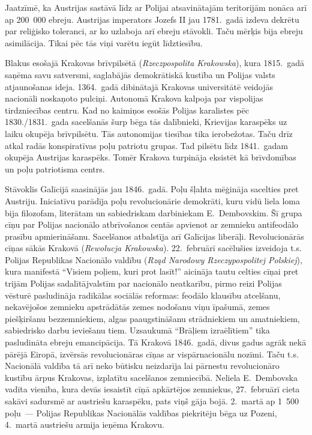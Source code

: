 \documentclass[twoside,a5paper,12pt,fleqn,openany]{extbook}
\newcommand{\pltxti}[1]{\textit{\textpolish{#1}}}
\begin{document}
Jaatzīmē, ka Austrijas sastāvā līdz ar Polijai atsavinātajām teritorijām nonāca arī ap 200~000 ebreju. Austrijas imperators Jozefs II jau 1781.~gadā izdeva dekrētu par reliģisko toleranci, ar ko uzlaboja arī ebreju stāvokli. Taču mērķis bija ebreju asimilācija. Tikai pēc tās viņi varētu iegūt līdztiesību.

Blakus esošajā Krakovas brīvpilsētā (\pltxti{Rzeczpospolita Krakowska}), kura 1815.~gadā saņēma savu satversmi, saglabājās demokrātiskā kustība un Polijas valsts atjaunošanas ideja. 1364.~gadā dibinātajā Krakovas universitātē veidojās nacionāli noskaņoto pulciņi. Autonomā Krakova kalpoja par vispolijas tirdzniecības centru. Kad no kaimiņos esošās Polijas karalistes pēc 1830./1831.~gada sacelšanās šurp bēga tās dalībnieki, Krievijas karaspēks uz laiku okupēja brīvpilsētu. Tās autonomijas tiesības tika ierobežotas. Taču drīz atkal radās konspiratīvas poļu patriotu grupas. Tad pilsētu līdz 1841.~gadam okupēja Austrijas karaspēks. Tomēr Krakova turpināja eksistēt kā brīvdomības un poļu patriotisma centrs.

Stāvoklis Galīcijā saasinājās jau 1846.~gadā. Poļu šļahta mēģināja sacelties pret Austriju. Iniciatīvu parādīja poļu revolucionārie demokrāti, kuru vidū liela loma bija filozofam, literātam un sabiedriskam darbiniekam E.~Dembovskim. Šī grupa cīņu par Polijas nacionālo atbrīvošanos centās apvienot ar zemnieku antifeodālo prasību apmierināšanu. Sacelšanos atbalstīja arī Galīcijas liberāļi. Revolucionārās cīņas sākās Krakovā (\pltxti{Rewolucja Krakowska}). 22.~februārī sacēlušies izveidoja t.s. Polijas Republikas Nacionālo valdību (\pltxti{Rząd Narodowy Rzeczypospolitej Polskiej}), kura manifestā ``Visiem poļiem, kuri prot lasīt!'' aicināja tautu celties cīņai pret trijām Polijas sadalītājvalstīm par nacionālo neatkarību, pirmo reizi Polijas vēsturē pasludināja radikālas sociālās reformas: feodālo klausību atcelšanu, nekavējošos zemnieku apstrādātās zemes nodošanu viņu īpašumā, zemes piešķiršanu bezzemniekiem, algas paaugstināšanu strādniekiem un amatniekiem, sabiedrisko darbu ieviešanu tiem. Uzsaukumā ``Brāļiem izraēlītiem'' tika pasludināta ebreju emancipācija. Tā Krakovā 1846.~gadā, divus gadus agrāk nekā pārējā Eiropā, izvērsās revolucionāras cīņas ar vispārnacionālu nozīmi. Taču t.s. Nacionālā valdība tā arī neko būtisku neizdarīja lai pārnestu revolucionāro kustību ārpus Krakovas, izplatītu sacelšanos zemniecībā. Neliela E.~Dembovska vadīta vienība, kura devās iesaistīt cīņā apkārtējos zemniekus, 27.~februārī cieta sakāvi sadursmē ar austriešu karaspēku, pats viņš gāja bojā. 2.~martā ap 1~500 poļu~--- Polijas Republikas Nacionālās valdības piekritēju bēga uz Pozeni, 4.~martā austriešu armija ieņēma Krakovu.
\end{document}
